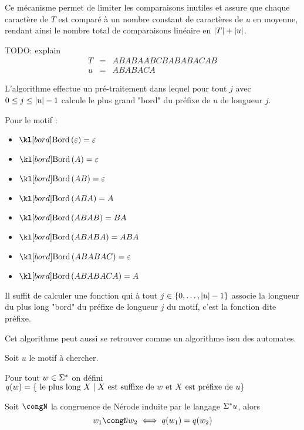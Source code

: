 Ce mécanisme permet de limiter les comparaisons inutiles et assure que chaque caractère de $T$
est comparé à un nombre constant de caractères de $u$ en moyenne, rendant ainsi le nombre total
de comparaisons linéaire en $|T| + |u|$.


\begin{exemple}
	TODO: explain
	\begin{eqnarray*}
		T &=& ABABAABCBABABACAB \\
		u &=& ABABACA
	\end{eqnarray*}
\end{exemple}


L'algorithme effectue un pré-traitement dans lequel pour tout $j$ avec $0 \leq j \leq |u| - 1$
calcule le plus grand "bord" du préfixe de $u$ de longueur $j$.

\begin{exemple}
	Pour le motif :

	\begin{itemize}
		\item $\Bord {\motvide} = \motvide$
		\item $\Bord A = \motvide$
		\item $\Bord {AB} = \motvide$
		\item $\Bord {ABA} = A$
		\item $\Bord {ABAB} = BA$
		\item $\Bord {ABABA} = ABA$
		\item $\Bord {ABABAC} = \motvide$
		\item $\Bord {ABABACA} = A$
	\end{itemize}
\end{exemple}

Il suffit de calculer une fonction qui à tout $j \in \left\{0,\ldots,|u| - 1\right\}$ associe
la longueur du plus long "bord" du préfixe de longueur $j$ du motif, c'est la fonction dite préfixe.


Cet algorithme peut aussi se retrouver comme un algorithme issu des automates.

Soit $u$ le motif à chercher.

\begin{definition}
	Pour tout $w \in \Sigma^{*}$ on défini
	$q(w) = \left\{\text{ le plus long } X \mid X \text{ est suffixe de } w \text{ et } X \text{ est préfixe de } u\right\}$
\end{definition}

\begin{prop}
	Soit $\congN$ la congruence de Nérode induite par le langage $\Sigma^{*} u$, alors
	$$ w_1 \congN w_2 \iff q(w_1) = q(w_2)$$
\end{prop}


